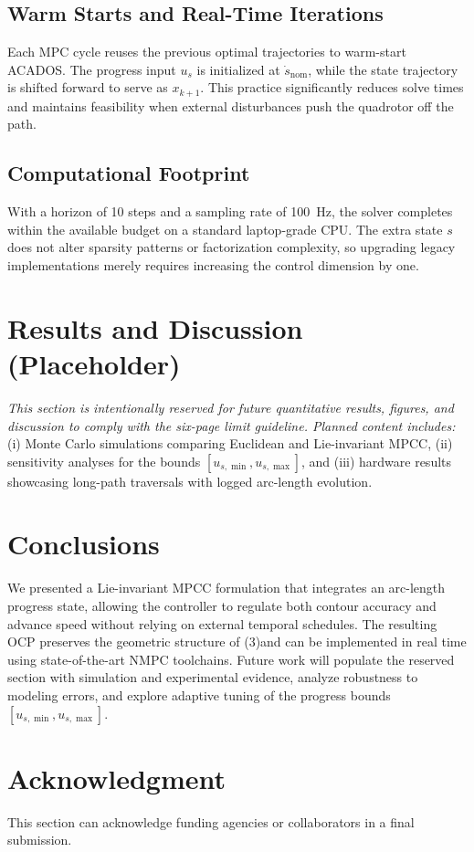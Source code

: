 \documentclass[letterpaper, 10pt, conference]{IEEEtran}
\newcommand{\SE}{\mathrm{SE}(3)}
\begin{document}
\subsection{Warm Starts and Real-Time Iterations}
Each MPC cycle reuses the previous optimal trajectories to warm-start ACADOS. The progress input $u_s$ is initialized at $\dot{s}_\mathrm{nom}$, while the state trajectory is shifted forward to serve as $x_{k+1}$. This practice significantly reduces solve times and maintains feasibility when external disturbances push the quadrotor off the path.

\subsection{Computational Footprint}
With a horizon of 10 steps and a sampling rate of 100~Hz, the solver completes within the available budget on a standard laptop-grade CPU. The extra state $s$ does not alter sparsity patterns or factorization complexity, so upgrading legacy implementations merely requires increasing the control dimension by one.

\section{Results and Discussion (Placeholder)}
\label{sec:results_placeholder}
\emph{This section is intentionally reserved for future quantitative results, figures, and discussion to comply with the six-page limit guideline. Planned content includes:} (i) Monte Carlo simulations comparing Euclidean and Lie-invariant MPCC, (ii) sensitivity analyses for the bounds $[u_{s,\min}, u_{s,\max}]$, and (iii) hardware results showcasing long-path traversals with logged arc-length evolution.

\section{Conclusions}
We presented a Lie-invariant MPCC formulation that integrates an arc-length progress state, allowing the controller to regulate both contour accuracy and advance speed without relying on external temporal schedules. The resulting OCP preserves the geometric structure of \SE and can be implemented in real time using state-of-the-art NMPC toolchains. Future work will populate the reserved section with simulation and experimental evidence, analyze robustness to modeling errors, and explore adaptive tuning of the progress bounds $[u_{s,\min}, u_{s,\max}]$.

\section*{Acknowledgment}
This section can acknowledge funding agencies or collaborators in a final submission.



\end{document}
